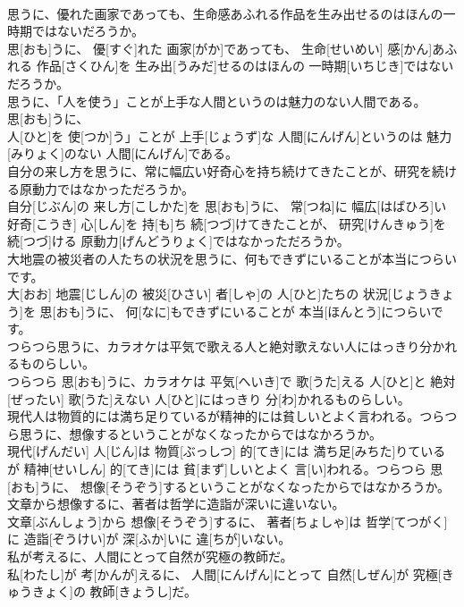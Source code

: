 \documentclass[8pt]{extreport}
\begin{document}
\begin{CJK}{UTF8}{min}
\\	思うに、優れた画家であっても、生命感あふれる作品を生み出せるのはほんの一時期ではないだろうか。	
\\	思[おも]うに、 優[すぐ]れた 画家[がか]であっても、 生命[せいめい] 感[かん]あふれる 作品[さくひん]を 生み出[うみだ]せるのはほんの 一時期[いちじき]ではないだろうか。
\\	思うに、「人を使う」ことが上手な人間というのは魅力のない人間である。	
\\	思[おも]うに、
\\	人[ひと]を 使[つか]う」ことが 上手[じょうず]な 人間[にんげん]というのは 魅力[みりょく]のない 人間[にんげん]である。
\\	自分の来し方を思うに、常に幅広い好奇心を持ち続けてきたことが、研究を続ける原動力ではなかっただろうか。	
\\	自分[じぶん]の 来し方[こしかた]を 思[おも]うに、 常[つね]に 幅広[はばひろ]い 好奇[こうき] 心[しん]を 持[も]ち 続[つづ]けてきたことが、 研究[けんきゅう]を 続[つづ]ける 原動力[げんどうりょく]ではなかっただろうか。
\\	大地震の被災者の人たちの状況を思うに、何もできずにいることが本当につらいです。	
\\	大[おお] 地震[じしん]の 被災[ひさい] 者[しゃ]の 人[ひと]たちの 状況[じょうきょう]を 思[おも]うに、 何[なに]もできずにいることが 本当[ほんとう]につらいです。
\\	つらつら思うに、カラオケは平気で歌える人と絶対歌えない人にはっきり分かれるものらしい。	
\\	つらつら 思[おも]うに、カラオケは 平気[へいき]で 歌[うた]える 人[ひと]と 絶対[ぜったい] 歌[うた]えない 人[ひと]にはっきり 分[わ]かれるものらしい。
\\	現代人は物質的には満ち足りているが精神的には貧しいとよく言われる。つらつら思うに、想像するということがなくなったからではなかろうか。	
\\	現代[げんだい] 人[じん]は 物質[ぶっしつ] 的[てき]には 満ち足[みちた]りているが 精神[せいしん] 的[てき]には 貧[まず]しいとよく 言[い]われる。つらつら 思[おも]うに、 想像[そうぞう]するということがなくなったからではなかろうか。
\\	文章から想像するに、著者は哲学に造詣が深いに違いない。	
\\	文章[ぶんしょう]から 想像[そうぞう]するに、 著者[ちょしゃ]は 哲学[てつがく]に 造詣[ぞうけい]が 深[ふか]いに 違[ちが]いない。
\\	私が考えるに、人間にとって自然が究極の教師だ。	
\\	私[わたし]が 考[かんが]えるに、 人間[にんげん]にとって 自然[しぜん]が 究極[きゅうきょく]の 教師[きょうし]だ。

\end{CJK}
\end{document}
